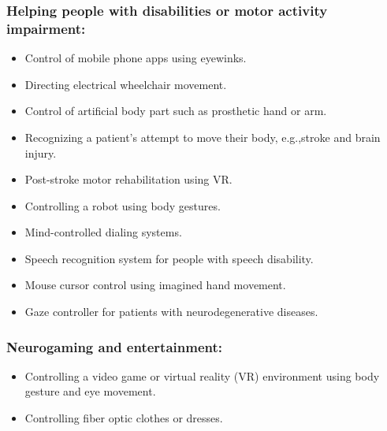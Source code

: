 \documentclass[12pt,a4paper]{article}
\begin{document}
\subsubsection{Helping people with disabilities or motor activity impairment:}

\begin{itemize}
\item Control of mobile phone apps using eyewinks.
\item Directing electrical wheelchair movement.
\item Control of artificial body part such as prosthetic hand or arm.
\item Recognizing a patient's attempt to move their body, e.g.,stroke and brain injury.
\item Post-stroke motor rehabilitation using VR.
\item Controlling a robot using body gestures.
\item Mind-controlled dialing systems.
\item Speech recognition system for people with speech disability.
\item Mouse cursor control using imagined hand movement.
\item Gaze controller for patients with neurodegenerative diseases.
\end{itemize}

\subsubsection{Neurogaming and entertainment:}

\begin{itemize}
\item Controlling a video game or virtual reality (VR) environment using body gesture and eye movement.
\item Controlling fiber optic clothes or dresses.
\end{itemize}
\end{document}
